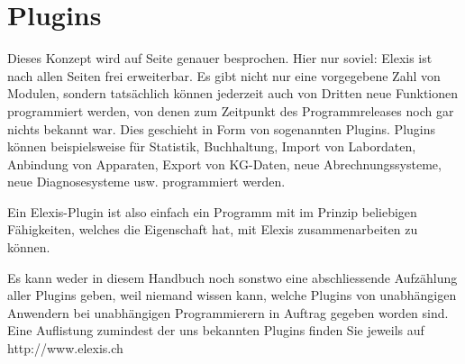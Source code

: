 \section{Plugins}
Dieses Konzept wird auf Seite \pageref{expl:plugins} genauer besprochen. Hier nur soviel: Elexis ist nach allen Seiten frei erweiterbar. Es gibt nicht nur eine vorgegebene Zahl von \glqq Modulen\grqq{}, sondern tatsächlich können jederzeit auch von Dritten neue Funktionen programmiert werden, von denen zum Zeitpunkt des Programmreleases noch gar nichts bekannt war. Dies geschieht in Form von sogenannten \glqq Plugins\grqq{}. Plugins können beispielsweise für Statistik, Buchhaltung, Import von Labordaten, Anbindung von Apparaten, Export von KG-Daten, neue Abrechnungssysteme, neue Diagnosesysteme usw. programmiert werden.

Ein Elexis-Plugin ist also einfach ein Programm mit im Prinzip beliebigen Fähigkeiten, welches die Eigenschaft hat, mit Elexis zusammenarbeiten zu können.

Es kann weder in diesem Handbuch noch sonstwo eine abschliessende Aufzählung aller Plugins geben, weil niemand wissen kann, welche Plugins von unabhängigen Anwendern bei unabhängigen Programmierern in Auftrag gegeben worden sind.  Eine Auflistung zumindest der uns bekannten Plugins finden Sie jeweils auf http://www.elexis.ch

